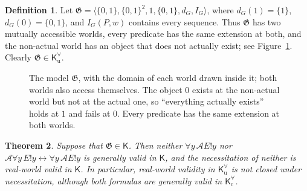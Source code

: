 \documentclass[11pt]{amsart}
\makeatletter
\theoremstyle{plain}
\newtheorem{theorem}{Theorem}[section]
\theoremstyle{definition}
\newtheorem{definition}[theorem]{Definition}
\theoremstyle{remark}
\newcommand{\Act}{\mathcal{A}}
\newcommand{\Kl}{\mathsf{K}}
\newcommand{\at}{@}
\makeatother
\begin{document}
\begin{definition}
Let $\mathfrak{G} = \langle \{0,1\}, \{0,1\}^2, 1, \{0,1\}, d_G,
I_G\rangle$, where $d_G(1) = \{1\}$, $d_G(0) = \{0,1\}$, and
$I_G(P,w)$ contains every sequence. Thus $\mathfrak{G}$ has two
mutually accessible worlds, every predicate has the same extension at
both, and the non-actual world has an object that does not actually
exist; see Figure~\ref{fig:growing}. Clearly
$\mathfrak{G} \in \Kl^\forall_{\mathrm{u}}$.
\end{definition}

\begin{figure}[ht]
\centering
{}
\caption{The model $\mathfrak{G}$, with the domain of each world drawn
inside it; both worlds also access themselves. The object $0$ exists at
the non-actual world but not at the actual one, so ``everything
actually exists'' holds at $1$ and fails at $0$. Every predicate has
the same extension at both worlds.}
\label{fig:growing}
\end{figure}

\begin{theorem}
\label{thm:q-separation}
Suppose that $\mathfrak{G} \in \Kl$. Then neither
$\forall y\,\Act E!y$ nor $\Act\forall y\,E!y \leftrightarrow
\forall y\,\Act E!y$ is generally valid in $\Kl$, and the
necessitation of neither is real-world valid in $\Kl$. In particular,
real-world validity in $\Kl^\forall_{\mathrm{u}}$ is not closed under
necessitation, although both formulas are generally valid in
$\Kl^\forall_{\mathrm{c}}$.
\end{theorem}
\end{document}
